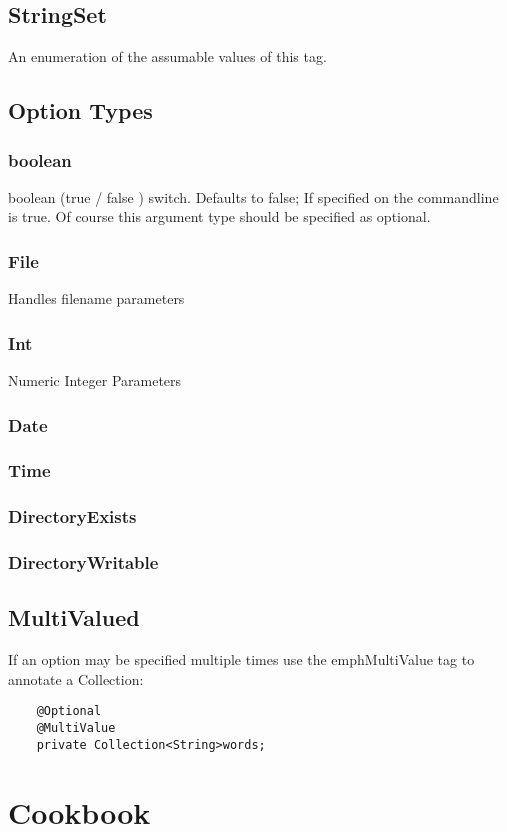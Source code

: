 \documentclass[a4paper,10pt]{article}
\begin{document}
\subsection{StringSet}
An enumeration of the assumable values of this tag.                


\subsection{Option Types}
\label{Option Types} 
\subsubsection{boolean}
boolean (true / false ) switch.  Defaults to false;  If specified on the commandline is true. 
Of course this argument type should be specified as optional.
\subsubsection{File}
Handles filename parameters
\subsubsection{Int}
Numeric Integer Parameters
\subsubsection{Date}
\subsubsection{Time}
\subsubsection{DirectoryExists}
\subsubsection{DirectoryWritable}
\subsection{MultiValued}
If an option may be specified multiple times use the emph{MultiValue} tag to annotate a Collection:
\begin{verbatim}
    @Optional
    @MultiValue
    private Collection<String>words;
\end{verbatim}

\pagebreak
\section{Cookbook}
\end{document}

